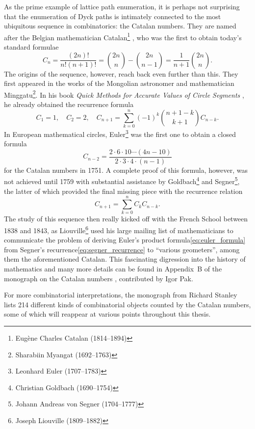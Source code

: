 As the prime example of lattice path enumeration, it is perhaps not surprising that the enumeration of Dyck paths is intimately connected to the most ubiquitous sequence in combinatorics: the Catalan numbers.
They are named after the Belgian mathematician Catalan\footnote{Eugène Charles Catalan (1814--1894)} , who was the first to obtain today's standard formulae
$$
  C_n = \frac{(2n)!}{n!(n+1)!} = \binom{2n}{n} - \binom{2n}{n-1} = \frac{1}{n + 1}\binom{2n}{n}.
$$
The origins of the sequence, however, reach back even further than this. They first appeared in the works of the Mongolian astronomer and mathematician Minggatu\footnote{Sharabiin Myangat (1692--1763)}. In his book \textit{Quick Methods for Accurate Values of Circle Segments} \cite{Mingatu}, he already obtained the recurrence formula
$$
  C_1 = 1, \quad C_2 = 2, \quad C_{n+1} = \sum_{k=0}^n (-1)^k \binom{n+1-k}{k+1}C_{n-k}.
$$
In European mathematical circles, Euler\footnote{Leonhard Euler (1707--1783)} was the first one to obtain a closed formula
\begin{equation}\label{eq:euler_formula}
  C_{n-2} = \frac{2 \cdot 6 \cdot 10 \cdots (4n -10)}{2\cdot 3 \cdot 4 \cdot (n-1)}
\end{equation}
for the Catalan numbers in 1751. A complete proof of this formula, however, was not achieved until 1759 with substantial assistance by Goldbach\footnote{Christian Goldbach (1690--1754)} and Segner\footnote{Johann Andreas von Segner (1704--1777)}, the latter of which provided the final missing piece with the recurrence relation
\begin{equation}\label{eq:segner_recurrence}
  C_{n+1} = \sum_{k=0}^n C_k C_{n-k}.
\end{equation}
The study of this sequence then really kicked off with the French School between 1838 and 1843, as Liouville\footnote{Joseph Liouville (1809--1882)} used his large mailing list of mathematicians to communicate the problem of deriving {Euler's product formula\eqref{eq:euler_formula}} from {Segner's recurrence\eqref{eq:segner_recurrence}} to ``various geometers'', among them the aforementioned Catalan. This fascinating digression into the history of mathematics and many more details can be found in Appendix~B of the monograph on the Catalan numbers \cite{CatalanNumbers}, contributed by Igor Pak.

For more combinatorial interpretations, the monograph \cite{CatalanNumbers} from Richard Stanley lists 214 different kinds of combinatorial objects counted by the Catalan numbers, some of which will reappear at various points throughout this thesis.

